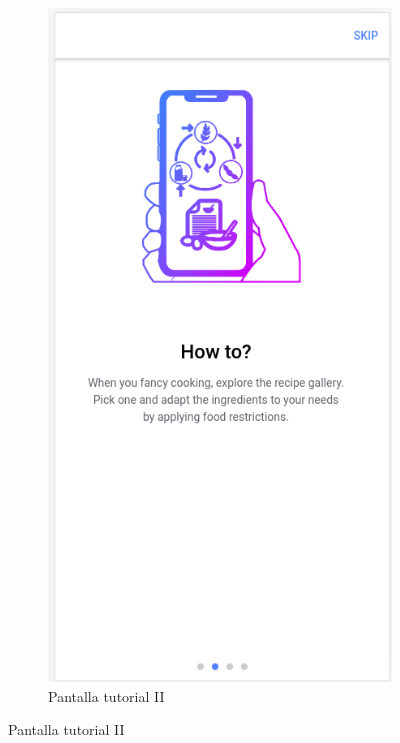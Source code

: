 \begin{figure}[H]
\begin{subfigure}[b]{0.31
    \linewidth}
        \label{fig:app_tutorial1}
    \end{subfigure}
    \begin{subfigure}[b]{0.31
    \linewidth}
        \includegraphics[width=\linewidth]{imagenes/app/pantallas/app_tutorial2.png}
        \caption{Pantalla tutorial II}

\end{subfigure}
\end{figure}
